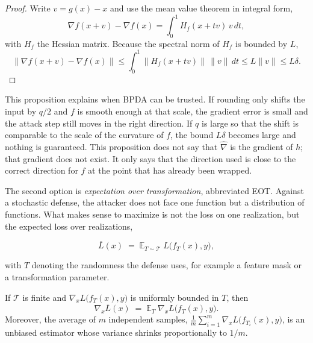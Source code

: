\begin{proof}
Write $v=g(x)-x$ and use the mean value theorem in integral form,
\begin{equation}
\nabla f(x+v)-\nabla f(x) = \int_0^1 H_f(x+tv)\,v\,dt,
\end{equation}
with $H_f$ the Hessian matrix. Because the spectral norm of $H_f$ is bounded by $L$,
\begin{equation}
\bigl\lVert \nabla f(x+v)-\nabla f(x)\bigr\rVert
\le \int_0^1 \lVert H_f(x+tv)\rVert\,\lVert v\rVert\,dt
\le L\lVert v\rVert \le L\delta .
\end{equation}
\end{proof}

This proposition explains when BPDA can be trusted. If rounding only shifts the
input by $q/2$ and $f$ is smooth enough at that scale, the gradient error is small and
the attack step still moves in the right direction. If $q$ is large so that the shift is
comparable to the scale of the curvature of $f$, the bound $L\delta$ becomes large and nothing is
guaranteed. This proposition does not say that $\widehat{\nabla}$ is the gradient of $h$; that
gradient does not exist. It only says that the direction used is close to the correct direction for
$f$ at the point that has already been wrapped.

The second option is \emph{expectation over transformation}, abbreviated EOT. Against
a stochastic defense, the attacker does not face one function but a distribution of functions.
What makes sense to maximize is not the loss on one realization, but the expected
loss over realizations,

\begin{equation}
\overline{L}(x) \;=\; \mathbb{E}_{T\sim\mathcal{T}}\; L\bigl(f_T(x),y\bigr),
\end{equation}

with $T$ denoting the randomness the defense uses, for example a feature mask or a
transformation parameter.

\begin{lemma}
If $\mathcal{T}$ is finite and $\nabla_x L\bigl(f_T(x),y\bigr)$ is uniformly bounded
in $T$, then
\begin{equation}
\nabla_x \overline{L}(x) \;=\; \mathbb{E}_{T}\;\nabla_x L\bigl(f_T(x),y\bigr).
\end{equation}
Moreover, the average of $m$ independent samples,
$\frac{1}{m}\sum_{i=1}^{m}\nabla_x L\bigl(f_{T_i}(x),y\bigr)$, is an unbiased estimator
whose variance shrinks proportionally to $1/m$.
\end{lemma}

